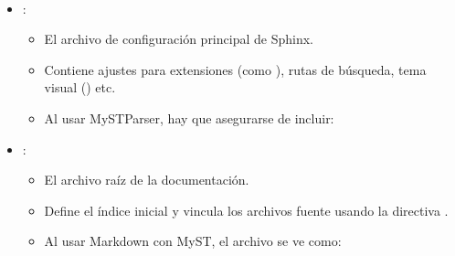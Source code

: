 \documentclass[a4paper,10pt,oneside,spanish,openany]{sphinxmanual}
\begin{document}
\paragraph{}
\label{\detokenize{configuracion_inicial/004.estructura_inicial_proyecto:archivos-importantes-en-source}}\begin{itemize}
\item {} 
\sphinxAtStartPar
{}:
\begin{itemize}
\item {} 
\sphinxAtStartPar
El archivo de configuración principal de Sphinx.

\item {} 
\sphinxAtStartPar
Contiene ajustes para extensiones (como ), rutas de búsqueda, tema visual () etc.

\item {} 
\sphinxAtStartPar
Al usar MyST\sphinxhyphen{}Parser, hay que asegurarse de incluir:

\begin{sphinxVerbatim}[commandchars=\\\{\}]
  \PYG{p}{[}\PYG{p}{]}
  
     
\end{sphinxVerbatim}

\end{itemize}

\item {} 
\sphinxAtStartPar
{}:
\begin{itemize}
\item {} 
\sphinxAtStartPar
El archivo raíz de la documentación.

\item {} 
\sphinxAtStartPar
Define el índice inicial y vincula los archivos fuente usando la directiva .

\item {} 
\sphinxAtStartPar
Al usar Markdown con MyST, el archivo se ve como:


\end{itemize}
\end{itemize}
\end{document}

